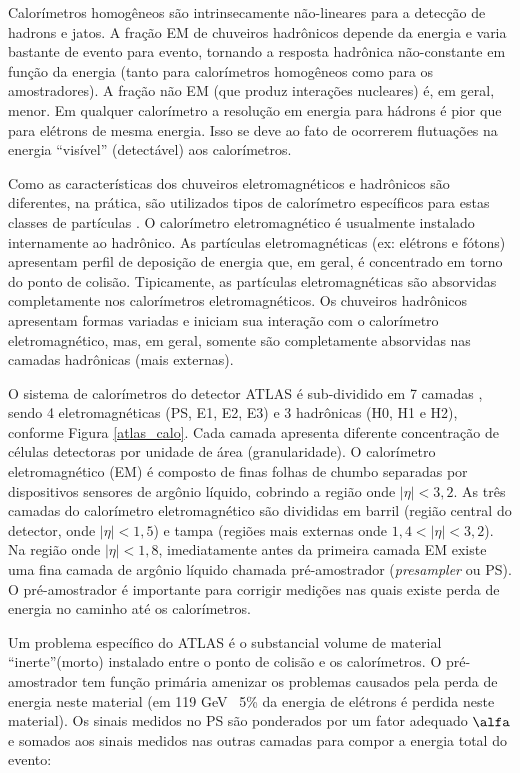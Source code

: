 Calorímetros homogêneos são intrinsecamente não-lineares para a detecção de hadrons e jatos. A fração EM de chuveiros hadrônicos depende da energia e varia bastante de evento para evento, tornando a resposta hadrônica não-constante em função da energia (tanto para calorímetros homogêneos como para os amostradores). A fração não EM (que produz interações nucleares) é, em geral, menor. Em qualquer calorímetro a resolução em energia para hádrons é pior que para elétrons de mesma energia. Isso se deve ao fato de ocorrerem flutuações na energia ``visível” (detectável) aos calorímetros.


Como as características dos chuveiros eletromagnéticos e hadrônicos
são di\-fe\-ren\-tes, na prática, são utilizados tipos de
calorímetro específicos para estas classes de partículas
\cite{book:martin:2006}. O calorímetro eletromagnético é usualmente
instalado internamente ao hadrônico. As partículas eletromagnéticas
(ex: elétrons e fótons) apresentam perfil de deposição de energia
que, em geral, é concentrado em torno do ponto de colisão.
Tipicamente, as partículas eletromagnéticas são absorvidas
completamente nos calorímetros eletromagnéticos. Os chuveiros
hadrônicos apresentam formas va\-ria\-das e iniciam sua interação
com o calorímetro eletromagnético, mas, em geral, somente são completamente
absorvidas nas camadas hadrônicas (mais externas).

O sistema de calorímetros do detector ATLAS
\cite{article:ATLAS:2008} é sub-dividido em 7 camadas \cite{atlascalo:2002}, sendo 4
eletromagnéticas (PS, E1, E2, E3) e 3 hadrônicas (H0, H1 e H2),
conforme Figura \ref{atlas_calo}. Cada camada apresenta diferente
concentração de células detectoras por unidade de área
(granularidade). O calorímetro eletromagnético (EM) é composto de
finas folhas de chumbo separadas por dispositivos sensores de
argônio líquido, cobrindo a região onde $|\eta|<3,2$. As três
camadas do calorímetro eletromagnético são divididas em barril
(região central do detector, onde $|\eta|<1,5$) e tampa (regiões
mais externas onde $1,4<|\eta|<3,2$). Na região onde $|\eta|<1,8$,
imediatamente antes da primeira camada EM existe uma fina camada de
argônio líquido chamada pré-amostrador (\textit{presampler} ou PS).
O pré-amostrador é importante para corrigir medições nas quais
existe perda de energia no caminho até os calorímetros.

Um problema específico do ATLAS é o substancial volume de material ``inerte”(morto) instalado entre o ponto de colisão e os calorímetros. O pré-amostrador tem função primária amenizar os problemas causados pela perda de energia neste material (em 119 GeV ~5\% da energia de elétrons é perdida neste material). Os sinais medidos no PS são ponderados por um fator adequado $\alfa$ e somados aos sinais medidos nas outras camadas para compor a energia total do evento:

